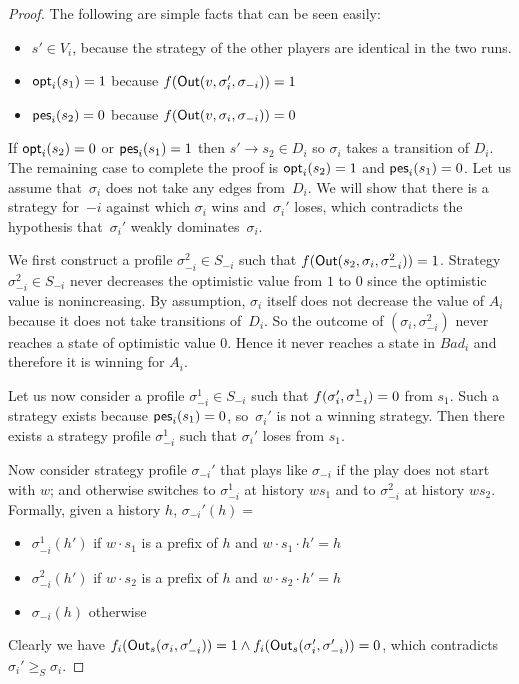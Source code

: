 \begin{proof}
The following are simple facts that can be seen easily:

\begin{itemize}
\item
  \(s' \in V_i\), because the strategy of the other players
  are identical in the two runs.
\item
  \(\textsf{opt}_i(s_1) = 1\) because
  \(f(\textsf{Out}(v,\sigma_i',\sigma_{-i}))=1\)
\item
  \(\textsf{pes}_i(s_2) = 0\) because
  \(f(\textsf{Out}(v,\sigma_i,\sigma_{-i}))=0\)
\end{itemize}

If \(\textsf{opt}_i(s_2) = 0\) or \(\textsf{pes}_i(s_1) = 1\) then
\(s' \rightarrow s_2 \in D_i\) so \(\sigma_i\) takes a transition of
\(D_i\). The remaining case to complete the proof is \(\textsf{opt}_i(s_2) = 1\)
and \(\textsf{pes}_i(s_1) = 0\).
Let us assume that~$\sigma_i$ does not take any edges from~$D_i$.
We will show that there is
a strategy for~$-i$ against which $\sigma_i$ wins and~$\sigma_i'$ loses,
which contradicts the hypothesis that~$\sigma_i'$ weakly dominates~$\sigma_i$.

We first construct a profile \(\sigma_{-i}^2 \in S_{-i}\) such that
\(f(\textsf{Out}(s_2,\sigma_i,\sigma_{-i}^2))=1\).
Strategy \(\sigma_{-i}^2\in S_{-i}\) never decreases
the optimistic value from \(1\) to \(0\) since the optimistic value is nonincreasing.
By assumption, \(\sigma_i\)
itself does not decrease the value of \(A_i\) because it does not take
transitions of~\(D_i\). So the outcome of \((\sigma_i,\sigma_{-i}^2)\)
never reaches a state of optimistic value \(0\). Hence it never reaches
a state in \(Bad_i\) and therefore it is winning for \(A_i\).

Let us now consider a profile \(\sigma_{-i}^1 \in S_{-i}\) such that
\(f(\sigma_i',\sigma_{-i}^1)=0\) from \(s_1\). Such a strategy exists
because
\(\textsf{pes}_i(s_1) = 0\), so~$\sigma_i'$ is not a winning strategy.
Then there exists a
strategy profile \(\sigma_{-i}^1\) such that \(\sigma_i'\) loses from
\(s_1\).

Now consider strategy profile \(\sigma_{-i}'\) that plays like
\(\sigma_{-i}\) if the play does not start with \(w\);
and otherwise switches to
\(\sigma_{-i}^1\) at history \(ws_1\) and to \(\sigma_{-i}^2\) at history \(ws_2\).
Formally, given a history \(h\), \(\sigma_{-i}'(h) =\)

\begin{itemize}
\item
  \(\sigma_{-i}^1( h')\) if \(w \cdot s_1\) is a prefix of \(h\) and
  \(w \cdot s_1 \cdot h' = h\)
\item
  \(\sigma_{-i}^2( h')\) if \(w \cdot s_2\) is a prefix of \(h\) and
  \(w \cdot s_2 \cdot h' = h\)
\item
  \(\sigma_{-i}(h)\) otherwise
\end{itemize}

Clearly we have
\(f_i(\textsf{Out}_s(\sigma_i,\sigma_{-i}'))= 1 \wedge f_i(\textsf{Out}_s(\sigma_i',\sigma_{-i}')) = 0\),
which contradicts \(\sigma_i' \ge_S \sigma_i\).
\end{proof}


